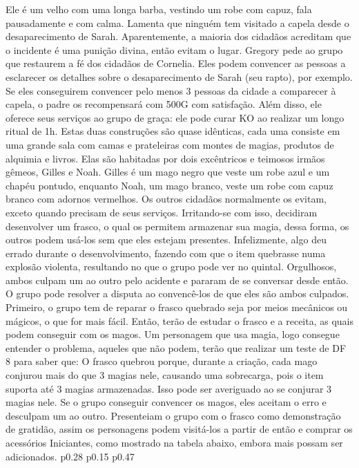 Ele é um velho com uma longa barba, vestindo um robe com capuz, fala pausadamente e com calma.
Lamenta que ninguém tem visitado a capela desde o desaparecimento de Sarah.
Aparentemente, a maioria dos cidadãos acreditam que o incidente é uma punição divina, então evitam o lugar.
Gregory pede ao grupo que restaurem a fé dos cidadãos de Cornelia.
Eles podem convencer as pessoas a esclarecer os detalhes sobre o desaparecimento de Sarah (seu rapto), por exemplo.
Se eles conseguirem convencer pelo menos 3 pessoas da cidade a comparecer à capela, o padre os recompensará com 500G com satisfação.
Além disso, ele oferece seus serviços ao grupo de graça: ele pode curar KO ao realizar um longo ritual de 1h.
%
\clearpage
%
 Estas duas construções são quase idênticas, cada uma consiste em uma grande sala com camas e prateleiras com montes de magias, produtos de alquimia e livros. 
Elas são habitadas por dois excêntricos e teimosos irmãos gêmeos, Gilles e Noah.
Gilles é um mago negro que veste um robe azul e um chapéu pontudo, enquanto Noah, um mago branco, veste um robe com capuz branco com adornos vermelhos.
Os outros cidadãos normalmente os evitam, exceto quando precisam de seus serviços.
Irritando-se com isso, decidiram desenvolver um frasco, o qual os permitem armazenar sua magia, dessa forma, os outros podem usá-los sem que eles estejam presentes.
Infelizmente, algo deu errado durante o desenvolvimento, fazendo com que o item quebrasse numa explosão violenta, resultando no que o grupo pode ver no quintal.
Orgulhosos, ambos culpam um ao outro pelo acidente e pararam de se conversar desde então.
O grupo pode resolver a disputa ao convencê-los de que eles são ambos culpados.
Primeiro, o grupo tem de reparar o frasco quebrado seja por meios mecânicos ou mágicos, o que for mais fácil.
Então, terão de estudar o frasco e a receita, as quais podem conseguir com os magos.
Um personagem que usa magia, logo consegue entender o problema, aqueles que não podem, terão que realizar um teste de DF 8 para saber que: O frasco quebrou porque, durante a criação, cada mago conjurou mais do que 3 magias nele, causando uma sobrecarga, pois o item suporta até 3 magias armazenadas.
Isso pode ser averiguado ao se conjurar 3 magias nele. 
Se o grupo conseguir convencer os magos, eles aceitam o erro e desculpam um ao outro.
Presenteiam o grupo com o frasco como demonstração de gratidão, assim os personagens podem visitá-los a partir de então e comprar os acessórios Iniciantes, como mostrado na tabela abaixo, embora mais possam ser adicionados.
%
\ofpar
%
\oftable
{p{0.28\columnwidth} p{0.15\columnwidth} p{0.47\columnwidth}} 
